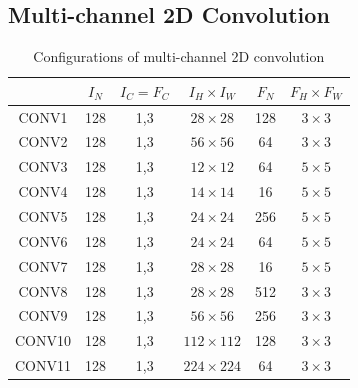 \subsection{Multi-channel 2D Convolution}
\label{multicconvexp}

\begin{table}[]
\caption{Configurations of multi-channel 2D convolution}
\label{tab:3dconvconfigs}
\begin{tabular}{c|ccccc}
\hline
& $I_N$ & $I_C=F_C$ & $I_H \times I_W$ & $F_N$ & $F_H \times F_W$ \\
\hline
CONV1 & 128  & 1,3       & $28\times 28$     & 128  & $3\times 3$       \\
CONV2 & 128  & 1,3       & $56\times 56$     & 64   & $3\times 3$       \\
CONV3 & 128  & 1,3       & $12\times 12$     & 64   & $5\times 5$       \\
CONV4 & 128  & 1,3       & $14\times 14$     & 16   & $5 \times 5$       \\
CONV5 & 128  & 1,3       & $24\times 24$    & 256  & $5 \times 5$       \\
CONV6 & 128  & 1,3       & $24\times 24$     & 64   & $5\times 5$       \\
CONV7 & 128  & 1,3       & $28\times 28$     & 16   & $5\times 5$       \\
CONV8 & 128  & 1,3       & $28\times 28$     & 512   & $3\times 3$       \\
CONV9 & 128  & 1,3       & $56\times 56$     & 256  & $3\times 3$       \\
CONV10 & 128  & 1,3       & $112\times 112$     & 128   & $3\times 3$       \\
CONV11 &128  & 1,3       & $224\times 224$     & 64   & $3\times 3$      \\
\hline
\end{tabular}
\end{table}

